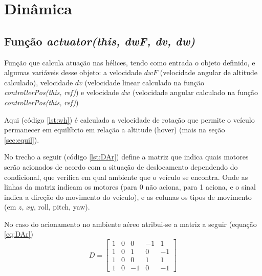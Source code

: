 \chapter{Dinâmica}
%


\section{Função \textit{actuator(this, dwF, dv, dw)}}
Função que calcula atuação nas hélices, tendo como entrada o objeto definido, e algumas variáveis desse objeto: a velocidade $dwF$ (velocidade angular de altitude calculado), velocidade $dv$ (velocidade linear calculado na função \textit{controllerPos(this, ref)}) e velocidade $dw$ (velocidade angular calculado na função \textit{controllerPos(this, ref)}) 

Aqui (código \ref{lst:wh}) é calculado a velocidade de rotação que permite o veículo permanecer em equilíbrio em relação a altitude (hover) (mais na seção \ref{sec:equil}). 





No trecho a seguir (código \ref{lst:DAr}) define a matriz que indica quais motores serão acionados de acordo com a situação de deslocamento dependendo do condicional, que verifica em qual ambiente que o veículo se encontra. Onde as linhas da matriz indicam os motores (para 0 não aciona, para 1 aciona, e o sinal indica a direção do movimento do veículo), e as colunas os tipos de movimento (em $z$, $xy$, roll, pitch, yaw). 



No caso do acionamento no ambiente aéreo atribui-se a matriz a seguir (equação \ref{eq:DAr})
\begin{equation}
    D =
    \begin{bmatrix}
        1 & 0 & 0 & -1 & 1 \\
        1 & 0 & 1 & 0 & -1 \\
        1 & 0 & 0 & 1 & 1 \\
        1 & 0 & -1 & 0 & -1 
    \end{bmatrix}
    \label{eq:DAr}
\end{equation}

